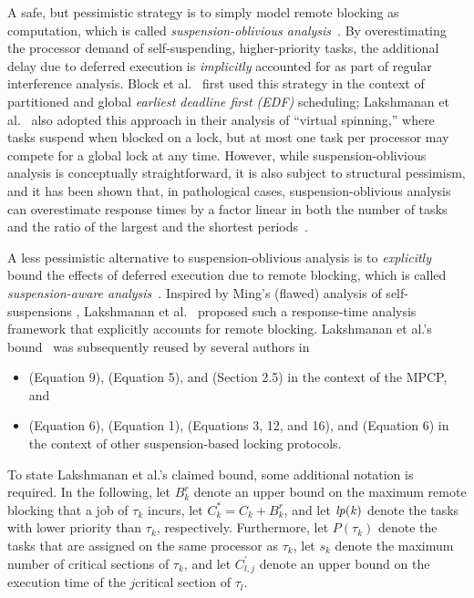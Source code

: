A safe, but pessimistic strategy is to simply model remote blocking as computation, which is called \emph{suspension-oblivious analysis}~\cite{BA:10b}. By overestimating the processor demand of self-suspending, higher-priority tasks, the additional delay due to deferred execution is \emph{implicitly} accounted for as part of regular interference analysis. Block et al.~\cite{block-2007} first used this strategy in the context of partitioned and global \emph{earliest deadline first (EDF)} scheduling; Lakshmanan et al.~\cite{lakshmanan-2009} also adopted this approach in their analysis of ``virtual spinning,'' where tasks suspend when blocked on a lock, but at most one task per processor may compete for a global lock at any time. However, while suspension-oblivious analysis is conceptually straightforward, it is also subject to structural pessimism, and it has been shown that, in pathological cases, suspension-oblivious analysis can overestimate response times by a factor linear in both the number of tasks and the ratio of the largest and the shortest periods~\cite{wieder-2013}.

A less pessimistic alternative to suspension-oblivious analysis is to \emph{explicitly} bound the effects of deferred execution due to remote blocking, which is called \emph{suspension-aware analysis}~\cite{BA:10b}. Inspired by Ming's (flawed) analysis of self-suspensions  \cite{MingLiRTCSA1994}, Lakshmanan et al.~\cite{lakshmanan-2009} proposed such a response-time analysis framework that explicitly accounts for remote blocking.  Lakshmanan et al.'s  bound~\cite{lakshmanan-2009} was subsequently reused by several authors in
\begin{itemize}
\item \cite{zeng-2011} (Equation 9), \cite{han-2014} (Equation 5), and \cite{yang-2014} (Section 2.5) in the context of the MPCP, and
\item \cite{yang-2013} (Equation 6), \cite{bbb-2013} (Equation 1), \cite{carminati-2014} (Equations 3, 12, and 16), and \cite{kim-2014} (Equation 6)  in the context of other suspension-based locking protocols.
\end{itemize}

To state  Lakshmanan et al.'s claimed bound, some additional notation is required. In the following, let $B_k^r$ denote an upper bound on the maximum remote blocking that a job of $\tau_k$ incurs, let $C_k^{\ast} = C_k + B_k^r$, and let $\mathit{lp(k)}$ denote the tasks with lower priority than $\tau_k$, respectively. Furthermore, let $P(\tau_k)$ denote the tasks that are assigned on the same processor as $\tau_k$, let $s_k$ denote the maximum number of critical sections of $\tau_k$, and let $C_{l,j}^{\prime}$ denote an upper bound on the execution time of the $j$\xth critical section of $\tau_l$.

